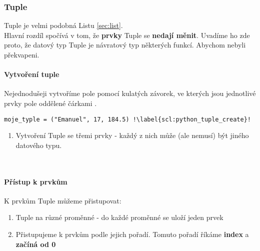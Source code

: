 \subsubsection{Tuple}
Tuple je velmi podobná Listu \ref{sec:list}.\\
Hlavní rozdíl spočívá v tom, že \textbf{prvky} Tuple se \textbf{nedají měnit}.
Uvadíme ho zde proto, že datový typ Tuple je návratový typ některých funkcí. Abychom nebyli překvapeni. 

\paragraph{Vytvoření tuple}
Nejednodušeji vytvoříme pole pomocí kulatých závorek, ve kterých jsou jednotlivé prvky pole oddělené čárkami .\\

\begin{minipage}[t]{.45\textwidth}
\begin{code}
\begin{verbatim}
moje_typle = ("Emanuel", 17, 184.5) !\label{scl:python_tuple_create}!
\end{verbatim}

\label{code:typy_tuple}
\end{code}
\end{minipage}
\begin{minipage}[t]{.45\textwidth}
\begin{enumerate}
\item[ř. \ref{scl:python_tuple_create}:] Vytvoření Tuple se třemi prvky - každý z nich může (ale nemusí) být jiného datového typu.
\end{enumerate}
\end{minipage}\\ 


\paragraph{Přístup k prvkům}
K prvkům Tuple můžeme přistupovat:
\begin{enumerate}
\item {} Tuple na různé proměnné - do každé proměnné se uloží jeden prvek
\item Přistupujeme k prvkům podle jejich pořadí. Tomuto pořadí říkáme \textbf{index} a \textbf{začíná od 0}
\end{enumerate}
  

